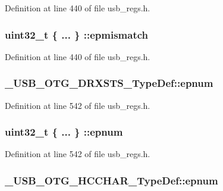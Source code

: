 Definition at line 440 of file usb\-\_\-regs.\-h.

\hypertarget{group___u_s_b___o_t_g___d_r_i_v_e_r_ga7fd24e441323f40173947a3b23cb6f2f}{
\subsubsection[{epmismatch}]{\setlength{\rightskip}{0pt plus 5cm}uint32\-\_\-t \{ ... \} \-::epmismatch}}\label{group___u_s_b___o_t_g___d_r_i_v_e_r_ga7fd24e441323f40173947a3b23cb6f2f}


Definition at line 440 of file usb\-\_\-regs.\-h.

\hypertarget{group___u_s_b___o_t_g___d_r_i_v_e_r_ga2f07aa5421872ec08403ee007de2a243}{
\subsubsection[{epnum}]{ \-\_\-\-U\-S\-B\-\_\-\-O\-T\-G\-\_\-\-D\-R\-X\-S\-T\-S\-\_\-\-Type\-Def\-::epnum}}\label{group___u_s_b___o_t_g___d_r_i_v_e_r_ga2f07aa5421872ec08403ee007de2a243}


Definition at line 542 of file usb\-\_\-regs.\-h.

\hypertarget{group___u_s_b___o_t_g___d_r_i_v_e_r_gac8dd56d0fc9060833e543a595b50402f}{
\subsubsection[{epnum}]{\setlength{\rightskip}{0pt plus 5cm}uint32\-\_\-t \{ ... \} \-::epnum}}\label{group___u_s_b___o_t_g___d_r_i_v_e_r_gac8dd56d0fc9060833e543a595b50402f}


Definition at line 542 of file usb\-\_\-regs.\-h.

\hypertarget{group___u_s_b___o_t_g___d_r_i_v_e_r_ga7e2db9d035440c79fe20394c7f2f6fb2}{
\subsubsection[{epnum}]{ \-\_\-\-U\-S\-B\-\_\-\-O\-T\-G\-\_\-\-H\-C\-C\-H\-A\-R\-\_\-\-Type\-Def\-::epnum}}\label{group___u_s_b___o_t_g___d_r_i_v_e_r_ga7e2db9d035440c79fe20394c7f2f6fb2}


